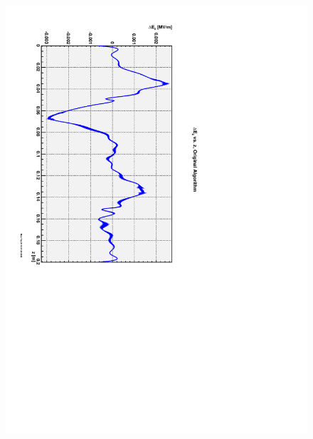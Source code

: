 \documentclass{report}
\begin{document}
\begin{figure}[hbt]
{    \includegraphics[scale=0.4,angle=90.0]{field-diff-original-FINSB-RAC.pdf}} \\
  \subfloat[][]{
    \label{Fi:figure-2c}
}
\end{figure}
\end{document}
